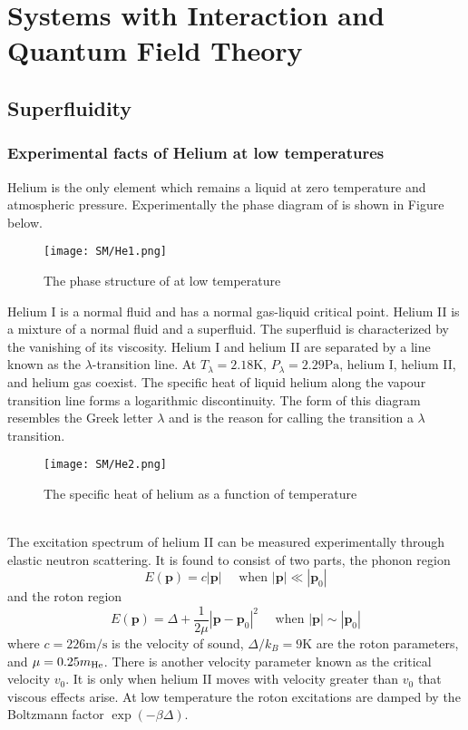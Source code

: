 \chapter{Systems with Interaction and Quantum Field Theory}
\section{Superfluidity}
\subsection{Experimental facts of Helium at low temperatures}
Helium is the only element which remains a liquid at zero temperature and atmospheric pressure.
Experimentally the phase diagram of  is shown in Figure below.
\begin{figure}[!h]
\centering
\texttt{[image: SM/He1.png]}
\caption{The phase structure of  at low temperature}
\end{figure}
Helium I is a normal fluid and has a normal gas-liquid critical point. Helium II is a mixture of a normal fluid and a superfluid. 
The superfluid is characterized by the vanishing of its viscosity. Helium I and helium II are separated by a line known as the $\lambda$-transition line.  At $T_{\lambda} = 2.18\mathrm{K}$, $P_{\lambda} = 2.29\mathrm{Pa}$, helium I, helium II, and helium gas coexist. 
The specific heat of liquid helium along the vapour transition line forms a logarithmic discontinuity. The form of this diagram resembles the Greek letter $\lambda$ and is the reason for calling the transition a $\lambda$ transition.
\begin{figure}[!h]
\centering
\texttt{[image: SM/He2.png]}
\caption{The specific heat of helium as a function of temperature}
\end{figure}
\\
The excitation spectrum of helium II can be measured experimentally through elastic neutron scattering. It is found to consist of two parts, the phonon region
\[E(\bm{p}) = c|\bm{p}| \quad \mbox{ when } |\bm{p}| \ll |\bm{p}_0|\]
and the roton region
\[E(\bm{p}) = \Delta + \frac{1}{2\mu} |\bm{p} - \bm{p}_0|^2 \quad \mbox{ when } |\bm{p}| \sim |\bm{p}_0|\]
where $c = 226 \mathrm{m/s}$ is the velocity of sound, $\Delta/k_B = 9\mathrm{K}$ are the roton parameters, and $\mu = 0.25m_{\rm He}$. 
There is another velocity parameter known as the critical velocity $v_0$. It is only when helium II moves with velocity greater than $v_0$ that viscous effects arise. At low temperature the roton excitations are damped by the Boltzmann factor $\exp(-\beta \Delta)$.

